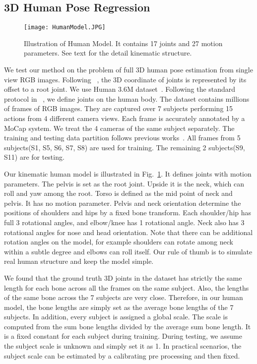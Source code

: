 \documentclass[runningheads]{llncs}
\begin{document}
\subsection{3D Human Pose Regression}

\begin{figure}
\begin{center}
\texttt{[image: HumanModel.JPG]}
\end{center}
   \caption{Illustration of Human Model. It contains 17 joints and 27 motion parameters. See text for the detail kinematic structure.}
\label{fig:humanmodel}
\end{figure}

We test our method on the problem of full 3D human pose estimation from single view RGB images. Following ~\cite{li20143d}, the 3D coordinate of joints is represented by its offset to a root joint. We use Human 3.6M dataset~\cite{h36m_pami}. Following the standard protocol in ~\cite{h36m_pami,li20143d,Zhou_2015_CVPR}, we define  joints on the human body. The dataset contains millions of frames of RGB images. They are captured over 7 subjects performing 15 actions from 4 different camera views. Each frame is accurately annotated by a MoCap system. We treat the 4 cameras of the same subject separately. The training and testing data partition follows previous works~\cite{h36m_pami,li20143d,Zhou_2016_CVPR}. All frames from 5 subjects(S1, S5, S6, S7, S8) are used for training. The remaining 2 subjects(S9, S11) are for testing.

Our kinematic human model is illustrated in Fig.~\ref{fig:humanmodel}. It defines  joints with  motion parameters. The pelvis is set as the root joint. Upside it is the neck, which can roll and yaw among the root. Torso is defined as the mid point of neck and pelvis. It has no motion parameter. Pelvis and neck orientation determine the positions of shoulders and hips by a fixed bone transform. Each shoulder/hip has full 3 rotational angles, and elbow/knee has 1 rotational angle. Neck also has 3 rotational angles for nose and head orientation. Note that there can be additional rotation angles on the model, for example shoulders can rotate among neck within a subtle degree and elbows can roll itself. Our rule of thumb is to simulate real human structure and keep the model simple.

We found that the ground truth 3D joints in the dataset has strictly the same length for each bone across all the frames on the same subject. Also, the lengths of the same bone across the 7 subjects are very close. Therefore, in our human model, the bone lengths are simply set as the average bone lengths of the 7 subjects. In addition, every subject is assigned a global scale. The scale is computed from the sum bone lengths divided by the average sum bone length. It is a fixed constant for each subject during training. During testing, we assume the subject scale is unknown and simply set it as 1. In practical scenarios, the subject scale can be estimated by a calibrating pre processing and then fixed.
\end{document}
